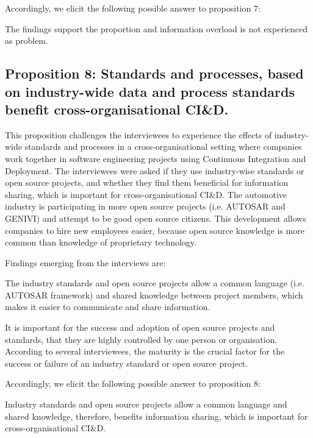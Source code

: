 Accordingly, we elicit the following possible answer to proposition 7:

The findings support the proportion and information overload is not experienced as problem.



\subsection{Proposition 8: Standards and processes, based on industry-wide data and process standards benefit cross-organisational CI\&D.}

This proposition challenges the interviewees to experience the effects of industry-wide standards and processes in a cross-organisational setting where companies work together in software engineering projects using Continuous Integration and Deployment. The interviewees were asked if they use industry-wise standards or open source projects, and whether they find them beneficial for information sharing, which is important for cross-organisational CI\&D. The automotive industry is participating in more open source projects (i.e. AUTOSAR and GENIVI) and attempt to be good open source citizens. This development allows companies to hire new employees easier, because open source knowledge is more common than knowledge of proprietary technology.

Findings emerging from the interviews are:

{} The industry standards and open source projects allow a common language (i.e. AUTOSAR framework) and shared knowledge between project members, which makes it easier to communicate and share information.

 It is important for the success and adoption of open source projects and standards, that they are highly controlled by one person or organisation. According to several interviewees, the maturity is the crucial factor for the success or failure of an industry standard or open source project.

Accordingly, we elicit the following possible answer to proposition 8:

Industry standards and open source projects allow a common language and shared knowledge, therefore, benefits information sharing, which is important for cross-organisational CI\&D.






